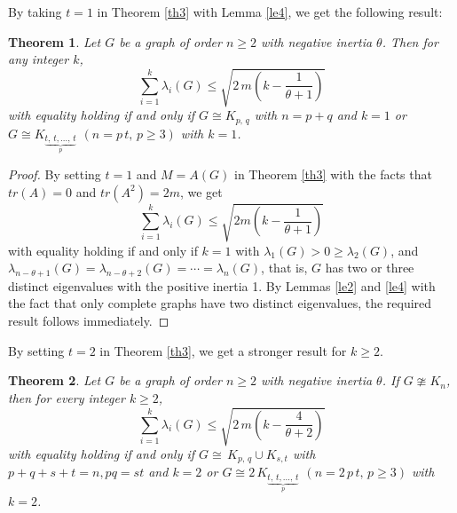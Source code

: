 \documentclass[12pt]{article}
\newtheorem{theorem}{Theorem}[section]
\begin{document}
 By taking $t=1$ in Theorem \ref{th3} with Lemma \ref{le4}, we get the following result:
 \begin{theorem} \label{coro1}
  Let $G$ be a graph of order $n\geq 2$ with negative inertia $\theta$. Then for any integer $k$,
 \begin{equation*}
 \sum_{i=1}^{k}\lambda_i(G)\leq \sqrt{2\,m\left(k-\frac{1}{\theta+1}\right)}
 \end{equation*}
 with equality holding if and only if  $G\cong K_{p,\,q}$ with $n=p+q$ and $k=1$ or $G\cong K_{\underbrace{t,\,t,\ldots,\,t}_p}$ $(n=p\,t,\,p\geq 3)$ with $k=1$.
 \end{theorem}

 \begin{proof}
 By setting $t=1$ and $M=A(G)$ in Theorem \ref{th3} with the facts that $tr(A)=0$ and $tr(A^2)=2m$, we get
 $$\sum_{i=1}^{k}\lambda_i(G)\leq\sqrt{2m\left(k-\frac{1}{\theta+1}\right)}$$
 with equality holding if and only if $k=1$ with $\lambda_1(G)>0\geq\lambda_2(G)$, and
 $\lambda_{n-\theta+1}(G)=\lambda_{n-\theta+2}(G)=\cdots=\lambda_n(G)$, that is, $G$ has two or three distinct eigenvalues with the positive inertia 1.
 By Lemmas \ref{le2} and \ref{le4} with the fact that only complete
 graphs have two distinct eigenvalues, the required result follows
 immediately.
  \end{proof}

 By setting $t=2$ in Theorem \ref{th3}, we get a stronger result for $k\geq 2$.
 \begin{theorem} \label{coro2} Let $G$ be a graph of order $n\geq 2$ with negative inertia $\theta$. If $G\ncong K_n$, then for every integer $k\geq 2$,
 \begin{equation*}
 \sum_{i=1}^{k}\lambda_i(G)\leq \sqrt{2\,m\left(k-\frac{4}{\theta+2}\right)}
 \end{equation*}
 with equality holding if and only if $G\cong \,K_{p,\,q}\cup K_{s,t}$ with $p+q+s+t=n, pq=st$ and $k=2$ or $G\cong 2\,K_{\underbrace{t,\,t,\ldots,\,t}_p}$ $(n=2\,p\,t,\,p\geq 3)$ with $k=2$.
 \end{theorem}
 
\end{document}
